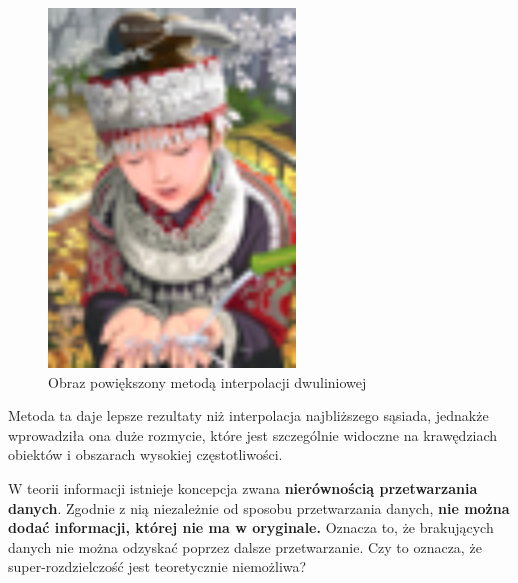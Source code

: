 \begin{figure}[ht]
\begin{minipage}[t]{0.35\linewidth}
        \includegraphics[width=\linewidth]{Rozdziały/02.Podstawy_teoretyczne/comic_BILINEARx4.png}
        \caption{Obraz powiększony metodą interpolacji dwuliniowej}
        \label{fig:image10}
    \end{minipage}
\end{figure}


Metoda ta daje lepsze rezultaty niż interpolacja najbliższego sąsiada, jednakże wprowadziła ona duże rozmycie, które jest szczególnie widoczne na krawędziach obiektów i obszarach wysokiej częstotliwości.


W teorii informacji istnieje koncepcja zwana \textbf{nierównością przetwarzania danych}. Zgodnie z nią niezależnie od sposobu przetwarzania danych, \textbf{nie można dodać informacji, której nie ma w oryginale.} Oznacza to, że brakujących danych nie można odzyskać poprzez dalsze przetwarzanie. Czy to oznacza, że super-rozdzielczość jest teoretycznie niemożliwa? 

